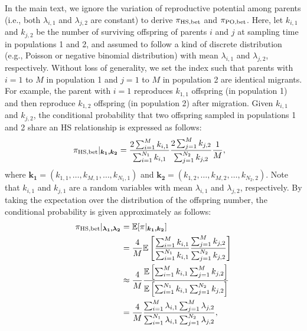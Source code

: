 \documentclass[12pt, English]{article}
\begin{document}
\begin{spacing}{1.9}
In the main text, we ignore the variation of reproductive potential among parents (i.e., both $\lambda_{i,1}$ and $\lambda_{j,2}$ are constant) to derive $\pi_{\rm HS,bet}$ and $\pi_{\rm PO,bet}$. Here, let $k_{i,1}$ and $k_{j,2}$ be the number of surviving offspring of parents $i$ and $j$ at sampling time in populations 1 and 2, and assumed to follow a kind of discrete distribution (e.g., Poisson or negative binomial distribution) with mean $\lambda_{i,1}$ and $\lambda_{j,2}$, respectively. Without loss of generality, we set the index such that parents with $i=1$ to $M$ in population 1 and $j=1$ to $M$ in population 2 are identical migrants. For example, the parent with $i=1$ reproduces $k_{1,1}$ offspring (in population 1) and then reproduce $k_{1,2}$ offspring (in population 2) after migration. Given $k_{i,1}$ and $k_{j,2}$, the conditional probability that two offspring sampled in populations 1 and 2 share an HS relationship is expressed as follows: 
\begin{align}
\pi_{\rm HS,bet} | _{\boldsymbol{k_1, k_2}} &= \frac{ 2\sum_{i=1}^M k_{i,1} } { \sum_{i=1}^{N_1} k_{i,1} } \frac{ 2\sum_{j=1}^M k_{j,2} } { \sum_{j=1}^{N_2} k_{j,2} } \frac{1}{M}, 
\end{align}
where $\boldsymbol{k_1}=(k_{1,1}, \ldots, k_{M,1}, \ldots, k_{N_1,1})$ and $\boldsymbol{k_2}=(k_{1,2}, \ldots, k_{M,2}, \ldots, k_{N_2,2})$. Note that $k_{i,1}$ and $k_{j,1}$ are a random variables with mean $\lambda_{i,1}$ and $\lambda_{j,2}$, respectively. By taking the expectation over the distribution of the offspring number, the conditional probability is given approximately as follows:
\begin{align}
\pi_{\rm HS,bet} | _{\boldsymbol{\lambda_1, \lambda_2}} &= \mathbb{E}[\pi | _{\boldsymbol{k_1, k_2}}] \nonumber\\
&= \frac{4}{M} \mathbb{E}\left[\frac{ \sum_{i=1}^M k_{i,1} } { \sum_{i=1}^{N_1} k_{i,1} } \frac{ \sum_{j=1}^M k_{j,2} } { \sum_{j=1}^{N_2} k_{j,2} } \right]   \nonumber\\
&\approx \frac{4}{M} \frac{ \mathbb{E}\left[ \sum_{i=1}^M k_{i,1} \sum_{j=1}^M k_{j,2} \right] } {\mathbb{E}\left[ \sum_{i=1}^{N_1} k_{i,1} \sum_{j=1}^{N_2} k_{j,2}\right]} \nonumber\\
&= \frac{4}{M} \frac{ \sum_{i=1}^M \lambda_{i,1} \sum_{j=1}^M \lambda_{j,2} } {\sum_{i=1}^{N_1} \lambda_{i,1} \sum_{j=1}^{N_2} \lambda_{j,2}},
\end{align}

\end{spacing}
\end{document}
